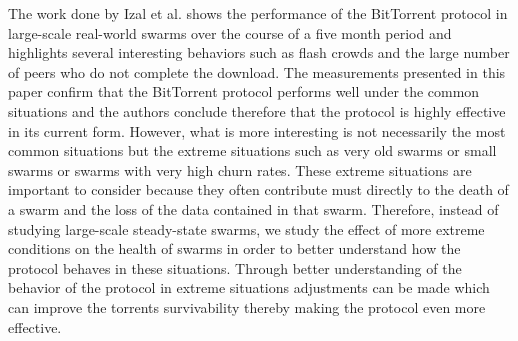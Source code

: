 The work done by Izal et al. \cite{izal} shows the performance of the BitTorrent
protocol in large-scale real-world swarms over the course of a five
month period and highlights several interesting behaviors such as
flash crowds and the large number of peers who do not complete the
download. The measurements presented in this paper confirm that the
BitTorrent protocol performs well under the common situations and the
authors conclude therefore that the protocol is highly effective in
its current form. However, what is more interesting is not necessarily
the most common situations but the extreme situations such as very old
swarms or small swarms or swarms with very high churn rates. These extreme
situations are important to consider because they often contribute must
directly to the death of a swarm and the loss of the data contained
in that swarm. Therefore, instead of studying large-scale steady-state
swarms, we study the effect of more extreme conditions on the health of
swarms in order to better understand how the protocol behaves in these
situations. Through better understanding of the behavior of the protocol
in extreme situations adjustments can be made which can improve the
torrents survivability thereby making the protocol even more effective.

